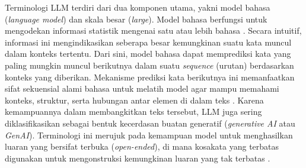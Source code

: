 Terminologi LLM terdiri dari dua komponen utama, yakni model bahasa (\textit{language model}) dan skala besar (\textit{large}). Model bahasa berfungsi untuk mengodekan informasi statistik mengenai satu atau lebih bahasa \parencite{huyenAIEngineeringBuilding2025}. Secara intuitif, informasi ini mengindikasikan seberapa besar kemungkinan suatu kata muncul dalam konteks tertentu. Dari sini, model bahasa dapat memprediksi kata yang paling mungkin muncul berikutnya dalam suatu \textit{sequence} (urutan) berdasarkan konteks yang diberikan. Mekanisme prediksi kata berikutnya ini memanfaatkan sifat sekuensial alami bahasa untuk melatih model agar mampu memahami konteks, struktur, serta hubungan antar elemen di dalam teks \parencite{raschkaBuildLargeLanguage2025}. Karena kemampuannya dalam membangkitkan teks tersebut, LLM juga sering diklasifikasikan sebagai bentuk kecerdasan buatan generatif (\textit{generative AI} atau \textit{GenAI}). Terminologi ini merujuk pada kemampuan model untuk menghasilkan luaran yang bersifat terbuka (\textit{open-ended}), di mana kosakata yang terbatas digunakan untuk mengonstruksi kemungkinan luaran yang tak terbatas \parencite{huyenAIEngineeringBuilding2025}.

